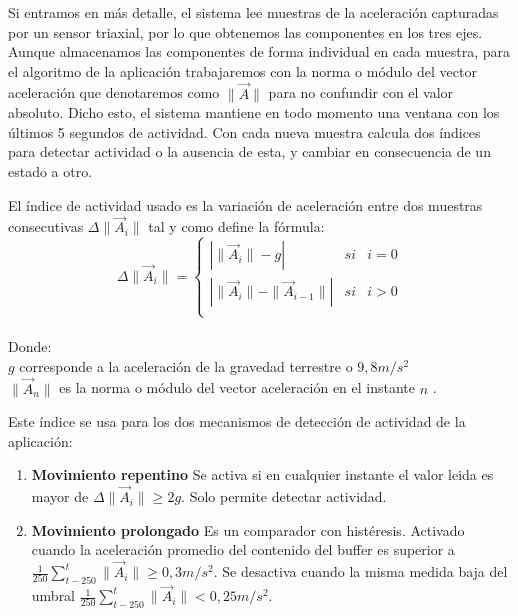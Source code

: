 
Si entramos en más detalle, el sistema lee muestras de la aceleración capturadas por un sensor triaxial, por lo que obtenemos las componentes en los tres ejes. Aunque almacenamos las componentes de forma individual en cada muestra, para el algoritmo de la aplicación trabajaremos con la norma o módulo del vector aceleración que denotaremos como $\|\vec{A}\|$ para no confundir con el valor absoluto. Dicho esto, el sistema mantiene en todo momento una ventana con los últimos 5 segundos de actividad. Con cada nueva muestra calcula dos índices para detectar actividad o la ausencia de esta, y cambiar en consecuencia de un estado a otro.

El índice de actividad usado es la variación de aceleración entre dos muestras consecutivas $\Delta \|\vec{A}_i\|$ tal y como define la fórmula:
\[
  \Delta \|\vec{A}_{i}\|=\left\{
    \begin{array}{lcl}
      |\|\vec{A}_i\| - g|       & si & i = 0 \\
      |\|\vec{A}_i\| - \|\vec{A}_{i-1}\|| & si & i > 0 \\
    \end{array}
    \right.
\]\\

Donde:\\
$g$ corresponde a la aceleración de la gravedad terrestre o $9,8m/s^2$\\
$\|\vec{A}_n\|$ es la norma o módulo del vector aceleración en el instante $n$ .

Este índice se usa para los dos mecanismos de detección de actividad de la aplicación:

\begin{enumerate}
  \item \textbf{Movimiento repentino} Se activa si en cualquier instante el valor leida es mayor de $\Delta \|\vec{A}_i\|\geq2g$. Solo permite detectar actividad.
  \item \textbf{Movimiento prolongado} Es un comparador con histéresis. Activado cuando la aceleración promedio del contenido del buffer es superior a $\frac{1}{250}\sum_{t-250}^t\|\vec{A}_i\|\geq0,3m/s^2$. Se desactiva cuando la misma medida baja del umbral $\frac{1}{250}\sum_{t-250}^t\|\vec{A}_i\|<0,25m/s^2$.
\end{enumerate}

